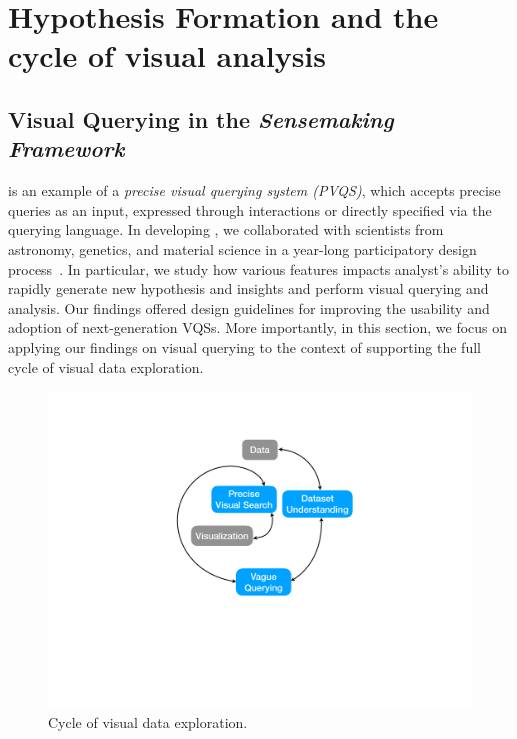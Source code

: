 \section{Hypothesis Formation and the cycle of visual analysis\label{sec:hypothesis}}
\subsection{Visual Querying in the \textit{Sensemaking Framework}}
\zv is an example of a \emph{precise visual querying system (PVQS)}, which accepts precise queries as an input, expressed through interactions or directly specified via the querying language. In developing \zv, we collaborated with scientists from astronomy, genetics, and material science in a year-long participatory design process~\cite{Lee2017}. In particular, we study how various features impacts analyst's ability to rapidly generate new hypothesis and insights and perform visual querying and analysis. Our findings offered design guidelines for improving the usability and adoption of next-generation VQSs. More importantly, in this section, we focus on applying our findings on visual querying to the context of supporting the full cycle of visual data exploration. 
\begin{figure}[h!]
\label{fig:cycle}
\centering
\includegraphics[width=0.4\linewidth]{figures/cycle.pdf}
\caption{Cycle of visual data exploration.}
\end{figure}
